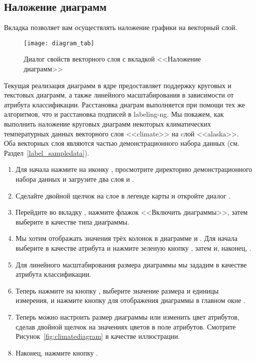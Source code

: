 \subsection{Наложение диаграмм}\label{sec:diagram}

Вкладка  позволяет вам осуществлять наложение графики на
векторный слой.

\begin{figure}[ht]
   \centering
   \texttt{[image: diagram\_tab]}
   \caption{Диалог свойств векторного слоя с вкладкой <<Наложение диаграмм>> \wincaption}\label{fig:diagramtab}
\end{figure}

Текущая реализация диаграмм в ядре предоставляет поддержку круговых и
текстовых диаграмм, а также линейного масштабирования в зависимости от
атрибута классификации. Расстановка диаграм выполняется при помощи тех же
алгоритмов, что и расстановка подписей в labeling-ng. Мы покажем, как
выполнить наложение круговых диаграмм некоторых климатических температурных
данных векторного слоя <<climate>> на cлой <<alaska>>. Оба векторных слоя
являются частью демонстрационного набора данных \qg (см. Раздел~\ref{label_sampledata}).

\begin{enumerate}
\item Для начала нажмите на иконку ,
просмотрите директорию демонстрационного набора данных \qg и загрузите два слоя
 и .
\item Сделайте двойной щелчок на слое  в легенде карты
и откройте диалог .
\item Перейдите во вкладку , нажмите флажок
<<Включить диаграммы>>, затем выберите  в качестве типа
диаграммы.
\item Мы хотим отображать значения трёх колонок в диаграмме
 и . Для начала выберите
 в качестве атрибута и нажмите зеленую кнопку \button{+},
затем  и, наконец, .
\item Для линейного масштабирования размера диаграммы мы зададим 
в качестве атрибута классификации.
\item Теперь нажмите на кнопку , выберите
значение размера и единицы измерения, и нажмите кнопку  для
отображения диаграммы в главном окне \qg.
\item Теперь можно настроить размер диаграммы или изменить цвет атрибутов,
сделав двойной щелчок на значениях цветов в поле атрибутов. Смотрите
Рисунок~\ref{fig:climatediagram} в качестве иллюстрации.
\item Наконец, нажмите кнопку .
\end{enumerate}

